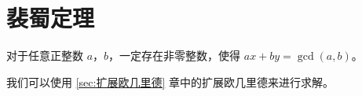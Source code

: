 \section{裴蜀定理} \label{sec:裴蜀定理}
对于任意正整数 $a$，$b$，一定存在非零整数，使得 $ax + by = \gcd(a, b)$。

我们可以使用 \ref{sec:扩展欧几里德} 章中的扩展欧几里德来进行求解。


